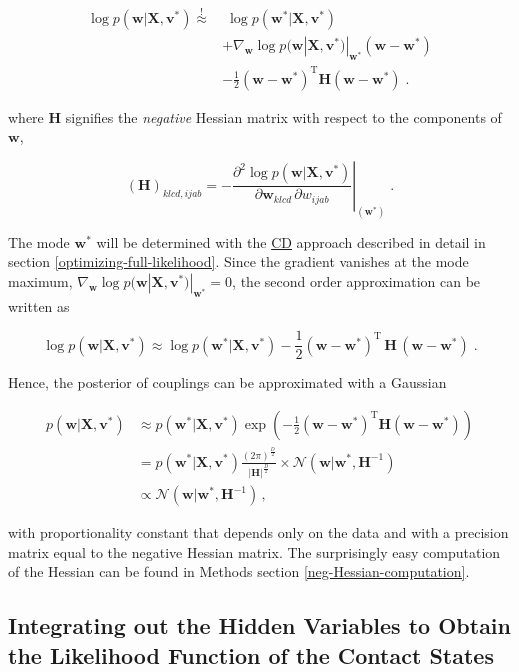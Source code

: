 \documentclass[11pt,a4paper,twoside]{book}
\newcommand{\Gauss}{\mathcal{N}}
\renewcommand{\H}{\mathbf{H}}
\renewcommand{\v}{\mathbf{v}}
\newcommand{\w}{\mathbf{w}}
\newcommand{\wijab}{w_{ijab}}
\newcommand{\X}{\mathbf{X}}
\theoremstyle{definition}
\theoremstyle{definition}
\theoremstyle{remark}
\begin{document}
\begin{align}
    \log p(\w | \X , \v^*) \overset{!}{\approx} &  \;  \log p(\w^* | \X , \v^*) \nonumber\\
                & + \nabla_\w \log p(\w | \X , \v^*)|_{\w^*}(\w-\w^*) \nonumber\\ 
                & - \frac{1}{2} (\w-\w^*)^{\mathrm{T}} \H (\w-\w^*)  \; .
\end{align}

where \(\H\) signifies the \emph{negative} Hessian matrix with respect
to the components of \(\w\),

\begin{equation}
    (\H)_{klcd, ijab} = - \left. \frac{\partial^2  \log p(\w | \X , \v^{*})}{\partial \w_{klcd} \, \partial \wijab  } \right|_{(\w^{*})} \; .
\end{equation}

The mode \(\w^*\) will be determined with the
\protect\hyperlink{abbrev}{CD} approach described in detail in section
\ref{optimizing-full-likelihood}. Since the gradient vanishes at the
mode maximum, \(\nabla_\w \log p(\w | \X , \v^*)|_{\w^*} = 0\), the
second order approximation can be written as

\begin{equation}
    \log p(\w | \X , \v^*) {\approx}  \log p(\w^* | \X , \v^*)  - \frac{1}{2} (\w-\w^*)^{\mathrm{T}} \, \H \, (\w-\w^*)  \;.
\end{equation}

Hence, the posterior of couplings can be approximated with a Gaussian

\begin{align}
   p(\w | \X , \v^*) &\approx p(\w^* | \X , \v^*) \exp \left( - \frac{1}{2} (\w-\w^*)^{\mathrm{T}} \H  (\w -\w^*) \right) \nonumber \\
              &= p(\w^* | \X , \v^*) \frac{(2 \pi)^\frac{D}{2}} { |\H|^\frac{D}{2}} \times \Gauss (\w | \w^*, \H^{-1} ) \nonumber \\
              &\propto  \Gauss (\w | \w^*, \H^{-1}) \,,
\label{eq:reg-lik-gauss-approx}
\end{align}

with proportionality constant that depends only on the data and with a
precision matrix equal to the negative Hessian matrix. The surprisingly
easy computation of the Hessian can be found in Methods section
\ref{neg-Hessian-computation}.

\subsection{Integrating out the Hidden Variables to Obtain the
Likelihood Function of the Contact
States}\label{likelihood-fct-distances}
\end{document}
